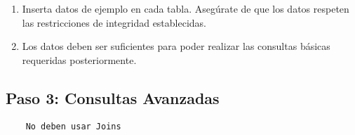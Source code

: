 \begin{enumerate}
    \item Inserta datos de ejemplo en cada tabla. Asegúrate de que los datos respeten las restricciones de integridad establecidas.
    \item Los datos deben ser suficientes para poder realizar las consultas básicas requeridas posteriormente.
\end{enumerate}

\subsection*{Paso 3: Consultas Avanzadas}
\begin{tcolorbox}[colback=red!5!white, colframe=red!75!black, title= Restricción]
\begin{verbatim}
    No deben usar Joins
\end{verbatim}
\end{tcolorbox}

